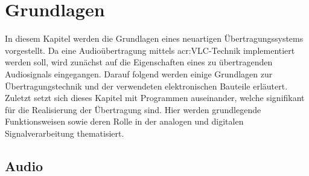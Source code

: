 \chapter{Grundlagen}
\label{chap:fundamentals_related-work}
In diesem Kapitel werden die Grundlagen eines neuartigen Übertragungssystems vorgestellt. Da eine Audioübertragung mittels \gls{acr:VLC}-Technik implementiert werden soll, wird zunächst auf die Eigenschaften eines zu übertragenden Audiosignals eingegangen. Darauf folgend werden einige Grundlagen zur Übertragungstechnik und der verwendeten elektronischen Bauteile erläutert. Zuletzt setzt sich dieses Kapitel mit Programmen auseinander, welche signifikant für die Realisierung der Übertragung sind. Hier werden grundlegende Funktionsweisen sowie deren Rolle in der analogen und digitalen Signalverarbeitung thematisiert. 

\section{Audio}
\label{subsec:audio}

